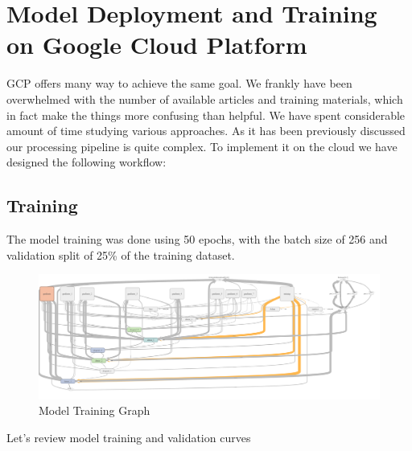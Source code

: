 \hypertarget{model-deployment-and-training-on-google-cloud-platform}{%
\section{Model Deployment and Training on Google Cloud
Platform}\label{model-deployment-and-training-on-google-cloud-platform}}

GCP offers many way to achieve the same goal. We frankly have been
overwhelmed with the number of available articles and training
materials, which in fact make the things more confusing than helpful. We
have spent considerable amount of time studying various approaches. As
it has been previously discussed our processing pipeline is quite
complex. To implement it on the cloud we have designed the following
workflow:

\hypertarget{training}{%
\subsection{Training}\label{training}}

The model training was done using 50 epochs, with the batch size of 256
and validation split of 25\% of the training dataset.

\begin{Schunk}
\begin{figure}[H]

{\centering \includegraphics[width=1\linewidth]{../images/model_graph} 

}

\caption[Model Training Graph]{Model Training Graph}\label{fig:grah}
\end{figure}
\end{Schunk}

Let's review model training and validation curves

